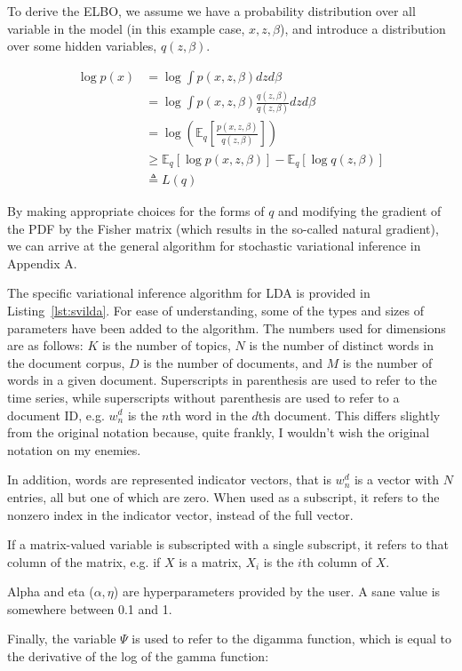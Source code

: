 \documentclass{article}
\newcommand{\bbE}{{\mathbb{E}}}
\begin{document}
To derive the ELBO, we assume we have a probability distribution over all
variable in the model (in this example case, $x,z,\beta$), and introduce
a distribution over some hidden variables, $q(z,\beta)$.

\begin{align*}
  \log p(x) &= \log \int  p(x,z,\beta) dz d\beta \\
            &= \log \int p(x,z,\beta) \frac{q(z,\beta)}{q(z,\beta)} dz d\beta\\
            &= \log \left( \bbE_q \left[ \frac{p(x,z,\beta)}{q(z,\beta)} \right] \right)\\
            &\geq \bbE_q[\log p(x,z,\beta)] - \bbE_q[\log q(z,\beta)]\\
            &\triangleq L(q)
\end{align*}

By making appropriate choices for the forms of $q$ and modifying the gradient of
the PDF by the Fisher matrix (which results in the so-called natural gradient),
we can arrive at the general algorithm for stochastic variational inference in
Appendix A.

The specific variational inference algorithm for LDA is provided in
Listing~\ref{lst:svilda}. For ease of understanding, some of the types and sizes
of parameters have been added to the algorithm. The numbers used for dimensions
are as follows: $K$ is the number of topics, $N$ is the number of distinct words
in the document corpus, $D$ is the number of documents, and $M$ is the number of
words in a given document. Superscripts in parenthesis are used to refer to the
time series, while superscripts without parenthesis are used to refer to a
document ID, e.g. $w_n^d$ is the $n$th word in the $d$th document. This differs
slightly from the original notation because, quite frankly, I wouldn't wish the
original notation on my enemies.

In addition, words are represented indicator vectors, that is $w_n^d$ is a vector with $N$
entries, all but one of which are zero. When used as a subscript, it refers to
the nonzero index in the indicator vector, instead of the full vector.

If a matrix-valued variable is subscripted with a single subscript, it
refers to that column of the matrix, e.g. if $X$ is a matrix, $X_i$ is the $i$th
column of $X$.

Alpha and eta ($\alpha,\eta$) are hyperparameters provided by the user. A sane
value is somewhere between 0.1 and 1.

Finally, the variable $\Psi$ is used to refer to the digamma function, which is
equal to the derivative of the log of the gamma function:
\end{document}
